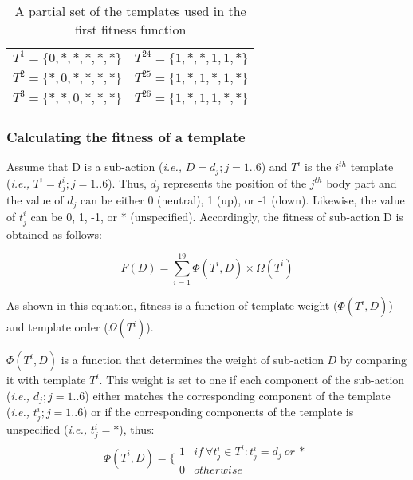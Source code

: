 \documentclass[a4paper,12pt,man,british]{apa6}
\begin{document}
\begin{table}
\caption{A partial set of the templates used in the first fitness function}
 \label{tab:templatestable}
\setlength{\tabcolsep}{1.5em}
\setlength{\extrarowheight}{6pt}
\centering
  \begin{tabular}{ll}         
	\toprule 
	\hline
		$T^1=\{0,*,*,*,*,*\}$ & $T^{24}=\{1,*,*,1,1,*\}$  \\ 
		$T^2=\{*,0,*,*,*,*\}$ & $T^{25}=\{1,*,1,*,1,*\}$   \\ 
		$T^3=\{*,*,0,*,*,*\}$ & $T^{26}=\{1,*,1,1,*,*\}$  \\ 
		
\hline 		
\bottomrule
\end{tabular}
\end{table}

\subsubsection{Calculating the fitness of a template}
Assume that D is a sub-action (\emph{i.e.,} $D={d_j};j=1..6$) and $T^i$ is the $i^{th}$ template (\emph{i.e.,} $T^i={t_j^i};j=1..6$). Thus, $d_j$ represents the position of the $j^{th}$ body part and the value of $d_j$ can be either 0 (neutral), 1 (up), or -1 (down). Likewise, the value of $t_j^i$ can be 0, 1, -1, or * (unspecified). Accordingly, the fitness of sub-action D is obtained as follows:

\begin{equation}
	F(D)=\sum_{i=1}^{19}{\Phi(T^i,D) \times \Omega(T^i)}
\label{eq:F D}
\end{equation}

As shown in this equation, fitness is a function of template weight ($\Phi(T^i,D)$) and template order ($\Omega(T^i)$).

$\Phi(T^i,D)$ is a function that determines the weight of sub-action $D$ by comparing it with template $T^i$. This weight is set to one if each component of the sub-action (\emph{i.e.,} $d_j;j=1..6$) either matches the corresponding component of the template (\emph{i.e.,} $t_j^i;j=1..6$) or if the corresponding components of the template is unspecified (\emph{i.e.,} $t_j^i= *$), thus:
\begin{eqnarray}
	\Phi(T^i,D) = \bigg\{ 
	\begin{matrix}
		1 & if \ \forall t_j^i \in T^i:t_j^i= d_j \ or \ * \\ 0 & otherwise	
	\end{matrix}	
\label{eq:template weight}
\end{eqnarray}
\end{document}
